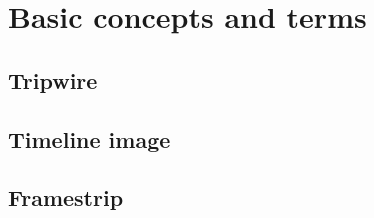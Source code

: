 \chapter{Basic concepts and terms}\label{chapt:Concepts}
\section{Tripwire}

\section{Timeline image}

\section{Framestrip}

